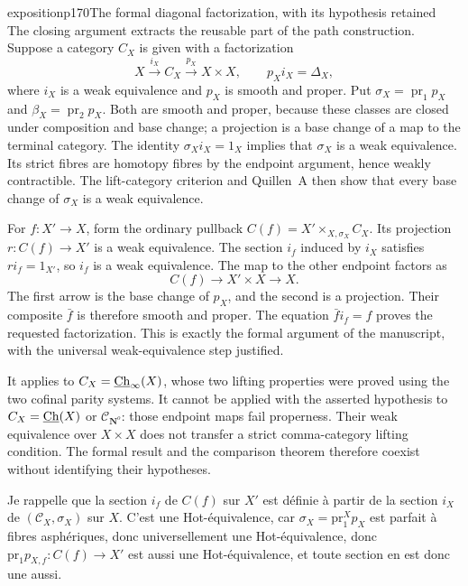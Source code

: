 \begin{dcomment}{exposition}{p170}{The formal diagonal factorization, with its hypothesis retained}
The closing argument extracts the reusable part of the path construction. Suppose a category $C_X$ is given with a factorization
\[
 X\xrightarrow{i_X}C_X\xrightarrow{p_X}X\times X,
 \qquad p_Xi_X=\Delta_X,
\]
where $i_X$ is a weak equivalence and $p_X$ is smooth and proper. Put $\sigma_X=\operatorname{pr}_1p_X$ and $\beta_X=\operatorname{pr}_2p_X$. Both are smooth and proper, because these classes are closed under composition and base change; a projection is a base change of a map to the terminal category. The identity $\sigma_Xi_X=1_X$ implies that $\sigma_X$ is a weak equivalence. Its strict fibres are homotopy fibres by the endpoint argument, hence weakly contractible. The lift-category criterion and Quillen~A then show that every base change of $\sigma_X$ is a weak equivalence.

For $f:X'\to X$, form the ordinary pullback $C(f)=X'\times_{X,\sigma_X}C_X$. Its projection $r:C(f)\to X'$ is a weak equivalence. The section $i_f$ induced by $i_X$ satisfies $ri_f=1_{X'}$, so $i_f$ is a weak equivalence. The map to the other endpoint factors as
\[
 C(f)\longrightarrow X'\times X\longrightarrow X.
\]
The first arrow is the base change of $p_X$, and the second is a projection. Their composite $\bar f$ is therefore smooth and proper. The equation $\bar f i_f=f$ proves the requested factorization. This is exactly the formal argument of the manuscript, with the universal weak-equivalence step justified.

It applies to $C_X=\underline{\mathrm{Ch}}_\infty(X)$, whose two lifting properties were proved using the two cofinal parity systems. It cannot be applied with the asserted hypothesis to $C_X=\underline{\mathrm{Ch}}(X)$ or $\mathcal C_{\mathbf N^o}$: those endpoint maps fail properness. Their weak equivalence over $X\times X$ does not transfer a strict comma-category lifting condition. The formal result and the comparison theorem therefore coexist without identifying their hypotheses.
\end{dcomment}


Je rappelle que la section $i_f$ de $C(f)$ sur $X'$ est définie à partir de la section $i_X$ de $(\mathcal{C}_X,\sigma_X)$ sur $X$. C'est une Hot-équivalence, car $\sigma_X = \mathrm{pr}_1^X p_X$ est parfait à fibres asphériques, donc universellement une Hot-équivalence, donc $\mathrm{pr}_1 p_{X,f} : C(f) \longrightarrow X'$ est aussi une Hot-équivalence, et toute section en est donc une aussi.


